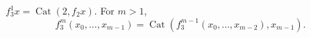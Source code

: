 $f_3^1 x = \operatorname{Cat}(2, f_2 x)$. For $m > 1$,
$$f_3^m(x_0, \ldots, x_{m-1}) = \operatorname{Cat}(f_3^{m-1}(x_0, \ldots, x_{m-2}), x_{m-1}).$$
